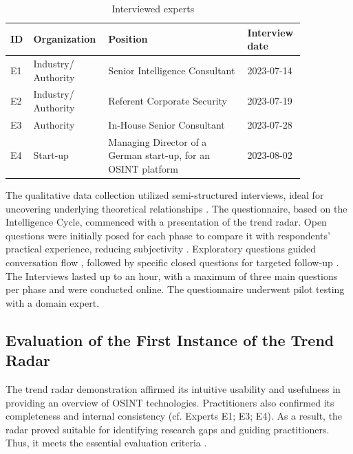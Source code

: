 \documentclass[10pt]{article}
\begin{document}
\begin{table}[hbtp]
    \caption{Interviewed experts}
    \begin{tabular}{p{0.05\linewidth}p{0.2\linewidth}p{0.45\linewidth}p{0.15\linewidth}}
        \toprule
        \textbf{ID} &\textbf{Organization} & \textbf{Position}                                             &  \textbf{Interview date}\\
        \hline
        E1  & Industry/ Authority   & Senior Intelligence Consultant                                &  2023-07-14       \\
        \hline
        E2 & Industry/ Authority   & Referent Corporate Security                                   & 2023-07-19         \\
        \hline
        E3  & Authority             & In-House Senior Consultant                                    & 2023-07-28        \\
        \hline
        E4  & Start-up              & Managing Director of a German start-up, for an OSINT platform & 2023-08-02        \\
        \bottomrule
    \end{tabular}
    \label{tab:experts}
\end{table}
The qualitative data collection utilized semi-structured interviews, ideal for uncovering underlying theoretical relationships \cite{Bogner.2014}. The questionnaire, based on the Intelligence Cycle, commenced with a presentation of the trend radar. Open questions were initially posed for each phase to compare it with respondents' practical experience, reducing subjectivity \cite{Saunders.2012}. Exploratory questions guided conversation flow \cite{Saunders.2012}, followed by specific closed questions for targeted follow-up \cite{Saunders.2012}. The Interviews lasted up to an hour, with a maximum of three main questions per phase \cite{Bogner.2014} and were conducted online. The questionnaire underwent pilot testing with a domain expert.

\subsection{Evaluation of the First Instance of the Trend Radar}

The trend radar demonstration affirmed its intuitive usability and usefulness in providing an overview of OSINT technologies. Practitioners also confirmed its completeness and internal consistency (cf. Experts E1; E3; E4). As a result, the radar proved suitable for identifying research gaps and guiding practitioners. Thus, it meets the essential evaluation criteria \cite{Sonnenberg.2012}.
\end{document}
